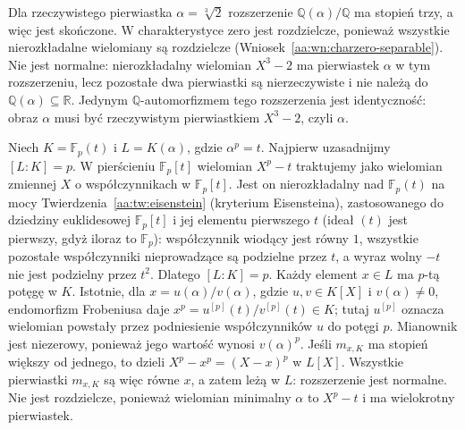 \begin{przyklad}
\label{aa:prz:separable-not-normal}
Dla rzeczywistego pierwiastka $\alpha=\sqrt[3]{2}$
rozszerzenie $\mathbb Q(\alpha)/\mathbb Q$ ma stopień trzy,
a więc jest skończone. W charakterystyce zero jest
rozdzielcze, ponieważ wszystkie nierozkładalne wielomiany
są rozdzielcze (Wniosek~\ref{aa:wn:charzero-separable}).
Nie jest normalne: nierozkładalny wielomian $X^3-2$
ma pierwiastek $\alpha$ w tym rozszerzeniu, lecz
pozostałe dwa pierwiastki są nierzeczywiste i nie należą
do $\mathbb Q(\alpha)\subseteq\mathbb R$.
Jedynym $\mathbb Q$-automorfizmem tego rozszerzenia
jest identyczność: obraz $\alpha$ musi być rzeczywistym
pierwiastkiem $X^3-2$, czyli $\alpha$.
\end{przyklad}

\begin{przyklad}
\label{aa:prz:normal-not-separable}
Niech $K=\mathbb F_p(t)$ i $L=K(\alpha)$, gdzie
$\alpha^p=t$. Najpierw uzasadnijmy $[L:K]=p$.
W pierścieniu $\mathbb F_p[t]$ wielomian $X^p-t$
traktujemy jako wielomian zmiennej $X$ o współczynnikach
w $\mathbb F_p[t]$. Jest on nierozkładalny nad
$\mathbb F_p(t)$ na mocy
Twierdzenia~\ref{aa:tw:eisenstein}
(kryterium Eisensteina), zastosowanego do dziedziny
euklidesowej $\mathbb F_p[t]$ i jej elementu pierwszego
$t$ (ideał $(t)$ jest pierwszy, gdyż iloraz to $\mathbb F_p$): współczynnik
wiodący jest równy $1$, wszystkie pozostałe
współczynniki nieprowadzące są podzielne przez $t$,
a wyraz wolny $-t$ nie jest podzielny przez $t^2$.
Dlatego $[L:K]=p$. Każdy element $x\in L$ ma $p$-tą potęgę w $K$.
Istotnie, dla $x=u(\alpha)/v(\alpha)$, gdzie
$u,v\in K[X]$ i $v(\alpha)\ne0$, endomorfizm
Frobeniusa daje
$x^p=u^{[p]}(t)/v^{[p]}(t)\in K$;
tutaj $u^{[p]}$ oznacza wielomian powstały przez
podniesienie współczynników $u$ do potęgi $p$.
Mianownik jest niezerowy, ponieważ jego wartość
wynosi $v(\alpha)^p$. Jeśli $m_{x,K}$
ma stopień większy od jednego, to dzieli
$X^p-x^p=(X-x)^p$ w $L[X]$. Wszystkie pierwiastki
$m_{x,K}$ są więc równe $x$, a zatem leżą w $L$:
rozszerzenie jest normalne. Nie jest rozdzielcze,
ponieważ wielomian minimalny $\alpha$ to $X^p-t$
i ma wielokrotny pierwiastek.
\end{przyklad}

